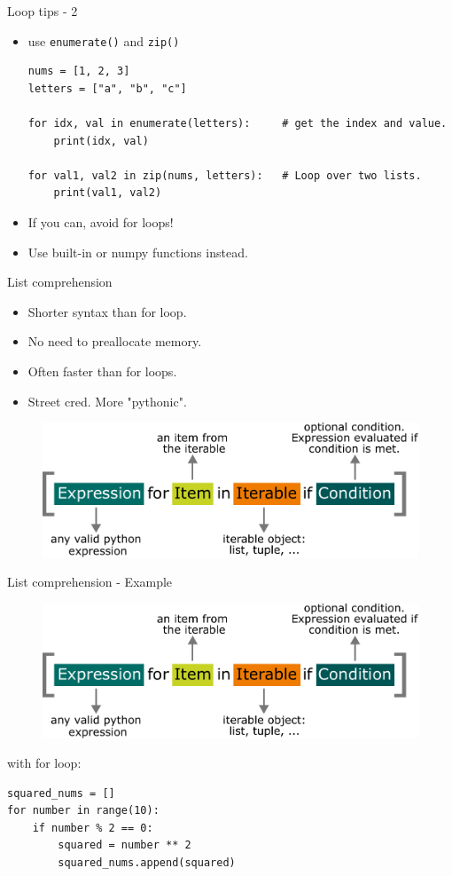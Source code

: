 \documentclass[compress%
,aspectratio=169%
]{beamer}
\newcommand{\code}{\lstinline}
\begin{document}
\begin{frame}[fragile]{Loop tips - 2}
\begin{itemize}
    \item use \code|enumerate()| and \code|zip()|
    
\begin{lstlisting}
nums = [1, 2, 3]
letters = ["a", "b", "c"]

for idx, val in enumerate(letters):     # get the index and value.
    print(idx, val)

for val1, val2 in zip(nums, letters):   # Loop over two lists.
    print(val1, val2)
\end{lstlisting}

    \item If you can, \alert{avoid for loops!}
    \item Use built-in or numpy functions instead.
\end{itemize}

\end{frame}




\begin{frame}[fragile]{List comprehension}
    \begin{itemize}
        \item Shorter syntax than for loop.
        \item No need to preallocate memory.
        \item Often faster than for loops.
        \item Street cred. More "pythonic".
    \end{itemize}
    
\begin{figure}
    \centering
    \includegraphics[width=0.6\linewidth]{mpimgbeamertheme/img/list_comprehension.pdf}
\end{figure}
\end{frame}

\begin{frame}[fragile]{List comprehension - Example}
\begin{figure}
    \centering
    \includegraphics[width=0.6\linewidth]{mpimgbeamertheme/img/list_comprehension.pdf}
\end{figure}

with for loop:
\begin{lstlisting}
squared_nums = []
for number in range(10):
    if number % 2 == 0:
        squared = number ** 2
        squared_nums.append(squared)
\end{lstlisting}
\end{frame}
\end{document}
